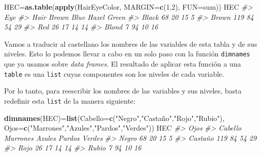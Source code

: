 \documentclass[
]{book}
\newenvironment{Shaded}{\begin{snugshade}}{\end{snugshade}}
\newcommand{\CommentTok}[1]{\textcolor[rgb]{0.56,0.35,0.01}{\textit{#1}}}
\newcommand{\DataTypeTok}[1]{\textcolor[rgb]{0.13,0.29,0.53}{#1}}
\newcommand{\DecValTok}[1]{\textcolor[rgb]{0.00,0.00,0.81}{#1}}
\newcommand{\KeywordTok}[1]{\textcolor[rgb]{0.13,0.29,0.53}{\textbf{#1}}}
\newcommand{\NormalTok}[1]{#1}
\newcommand{\StringTok}[1]{\textcolor[rgb]{0.31,0.60,0.02}{#1}}
\theoremstyle{definition}
\theoremstyle{definition}
\theoremstyle{definition}
\theoremstyle{remark}
\begin{document}
\begin{Shaded}
\begin{Highlighting}[]
\NormalTok{HEC=}\KeywordTok{as.table}\NormalTok{(}\KeywordTok{apply}\NormalTok{(HairEyeColor, }\DataTypeTok{MARGIN=}\KeywordTok{c}\NormalTok{(}\DecValTok{1}\NormalTok{,}\DecValTok{2}\NormalTok{), }\DataTypeTok{FUN=}\NormalTok{sum))}
\NormalTok{HEC}
\CommentTok{\#\textgreater{}        Eye}
\CommentTok{\#\textgreater{} Hair    Brown Blue Hazel Green}
\CommentTok{\#\textgreater{}   Black    68   20    15     5}
\CommentTok{\#\textgreater{}   Brown   119   84    54    29}
\CommentTok{\#\textgreater{}   Red      26   17    14    14}
\CommentTok{\#\textgreater{}   Blond     7   94    10    16}
\end{Highlighting}
\end{Shaded}

Vamos a traducir al castellano los nombres de las variables de esta tabla y de sus niveles. Esto lo podemos llevar a cabo en un solo paso con la función \texttt{dimnames} que ya usamos sobre \emph{data frames}.
El resultado de aplicar esta función a una \texttt{table} es una \texttt{list} cuyas componentes son los niveles de cada variable.

\begin{Shaded}
\end{Shaded}

Por lo tanto, para reescribir los nombres de las variables y sus niveles, basta redefinir esta \texttt{list} de la manera siguiente:

\begin{Shaded}
\begin{Highlighting}[]
\KeywordTok{dimnames}\NormalTok{(HEC)=}\KeywordTok{list}\NormalTok{(}\DataTypeTok{Cabello=}\KeywordTok{c}\NormalTok{(}\StringTok{"Negro"}\NormalTok{,}\StringTok{"Castaño"}\NormalTok{,}\StringTok{"Rojo"}\NormalTok{,}\StringTok{"Rubio"}\NormalTok{), }\DataTypeTok{Ojos=}\KeywordTok{c}\NormalTok{(}\StringTok{"Marrones"}\NormalTok{,}\StringTok{"Azules"}\NormalTok{,}\StringTok{"Pardos"}\NormalTok{,}\StringTok{"Verdes"}\NormalTok{))}
\NormalTok{HEC}
\CommentTok{\#\textgreater{}          Ojos}
\CommentTok{\#\textgreater{} Cabello   Marrones Azules Pardos Verdes}
\CommentTok{\#\textgreater{}   Negro         68     20     15      5}
\CommentTok{\#\textgreater{}   Castaño      119     84     54     29}
\CommentTok{\#\textgreater{}   Rojo          26     17     14     14}
\CommentTok{\#\textgreater{}   Rubio          7     94     10     16}
\end{Highlighting}
\end{Shaded}
\end{document}
